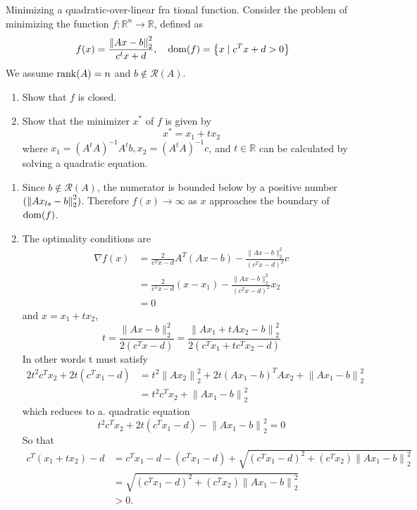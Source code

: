 \begin{problem}[9.2]
    Minimizing a quadratic-over-linear fra tional function. Consider the problem of minimizing the function $f: \mathbb{R}^n \to \mathbb{R}$, defined as \[f(x)=\frac{\norm{Ax - b}_{2}^{2}}{c^{t} x+d}, \quad \operatorname{dom}(f)=\left\{x \mid c^{T} x+d>0\right\}\] We assume $\rank(A) = n$ and $b \notin \mathcal{R}(A)$.
    \begin{enumerate}
        \item Show that $f$ is closed.
        \item Show that the minimizer $x^*$ of $f$ is given by\[x^* = x_1 + tx_2\] where $x_1 = (A^tA)^{-1}A^tb, x_2 = (A^tA)^{-1}c$, and $t \in \mathbb{R}$ can be calculated by solving a quadratic equation.
    \end{enumerate}
    \Answer \text{}\begin{enumerate}
        \item Since $b \notin \mathcal{R}(A)$, the numerator is bounded below by a positive number $(\norm{Ax_{ls} - b}_2^2)$. Therefore $f(x) \to \infty$ as $x$ approaches the boundary of $\operatorname{dom}(f)$.
        \item The optimality conditions are \begin{align*}
            \nabla f(x) &=\frac{2}{c^{T} x-d} A^{T}(A x-b)-\frac{\|A x-b\|_{2}^{2}}{\left(c^{T} x-d\right)^{2}} c \\
            &=\frac{2}{c^{T} x-d}\left(x-x_{1}\right)-\frac{\|A x-b\|_{2}^{2}}{\left(c^{T} x-d\right)^{2}} x_{2} \\
            &=0
        \end{align*}and $x = x_1 + tx_2$, \[t=\frac{\|A x-b\|_{2}^{2}}{2\left(c^{T} x-d\right)}=\frac{\left\|A x_{1}+t A x_{2}-b\right\|_{2}^{2}}{2\left(c^{T} x_{1}+t c^{T} x_{2}-d\right)}\]
        In other words t must satisfy \begin{align*}
            2 t^{2} c^{T} x_{2}+2 t\left(c^{T} x_{1}-d\right) &=t^{2}\left\|A x_{2}\right\|_{2}^{2}+2 t\left(A x_{1}-b\right)^{T} A x_{2}+\left\|A x_{1}-b\right\|_{2}^{2} \\
            &=t^{2} c^{T} x_{2}+\left\|A x_{1}-b\right\|_{2}^{2}
        \end{align*} which reduces to a. quadratic equation \[t^{2} c^{T} x_{2}+2 t\left(c^{T} x_{1}-d\right)-\left\|A x_{1}-b\right\|_{2}^{2}=0\] So that \begin{align*}
            c^{T}\left(x_{1}+t x_{2}\right)-d &=c^{T} x_{1}-d-\left(c^{T} x_{1}-d\right)+\sqrt{\left(c^{T} x_{1}-d\right)^{2}+\left(c^{T} x_{2}\right)\left\|A x_{1}-b\right\|_{2}^{2}} \\
            &=\sqrt{\left(c^{T} x_{1}-d\right)^{2}+\left(c^{T} x_{2}\right)\left\|A x_{1}-b\right\|_{2}^{2}} \\
            &>0 .
        \end{align*}
    \end{enumerate}
\end{problem}

